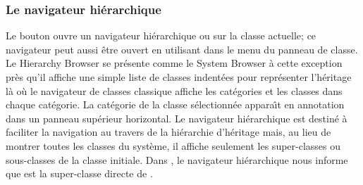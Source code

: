 \documentclass[a4paper,10pt,twoside]{book}
\begin{document}
\subsubsection{Le navigateur hi\'erarchique}
\label{sec:hierarchy}

Le bouton  ouvre un navigateur hi\'erarchique ou  sur la classe actuelle; ce navigateur
peut aussi \^etre ouvert en utilisant  dans le menu du
panneau de classe.
Le Hierarchy Browser se pr\'esente comme le System Browser \`a cette exception
pr\`es qu'il affiche une simple liste de classes indent\'ees pour repr\'esenter
l'h\'eritage l\`a o\`u le navigateur de classes classique affiche les cat\'egories et les classes dans chaque cat\'egorie.
La cat\'egorie de la classe s\'electionn\'ee appara\^{\i}t en annotation
dans un panneau sup\'erieur horizontal.
Le navigateur hi\'erarchique est destin\'e \`a faciliter la navigation au travers de la hi\'erarchie d'h\'eritage mais, au lieu de montrer toutes
les classes du syst\`eme, il affiche seulement les super-classes ou
sous-classes de la classe initiale. 
Dans , le navigateur hi\'erarchique nous
informe que  est la super-classe directe de 
.
\end{document}
